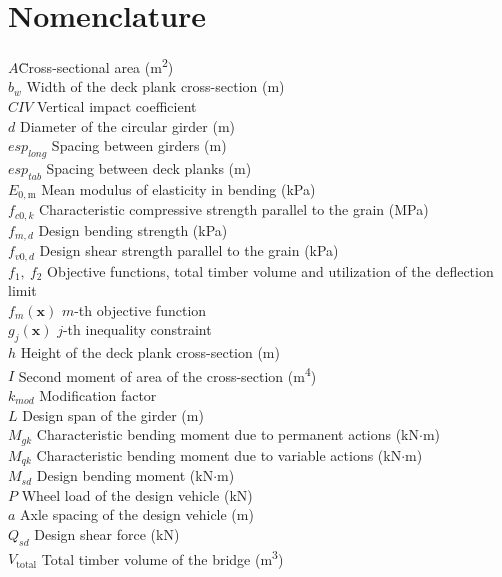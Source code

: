 \section*{Nomenclature}

\begin{tabbing}
$A$\qquad\qquad \= Cross-sectional area (m\textsuperscript{2})\\
$b_w$ \> Width of the deck plank cross-section (m)\\
$CIV$ \> Vertical impact coefficient\\
$d$ \> Diameter of the circular girder (m)\\
$esp_{long}$ \> Spacing between girders (m)\\
$esp_{tab}$ \> Spacing between deck planks (m)\\
$E_{0,\mathrm{m}}$ \> Mean modulus of elasticity in bending (kPa)\\
$f_{c0,k}$ \> Characteristic compressive strength parallel to the grain (MPa)\\
$f_{m,d}$ \> Design bending strength (kPa)\\
$f_{v0,d}$ \> Design shear strength parallel to the grain (kPa)\\
$f_1,\ f_2$ \> Objective functions, total timber volume and utilization of the deflection limit\\
$f_m(\mathbf{x})$ \> $m$-th objective function\\
$g_j(\mathbf{x})$ \> $j$-th inequality constraint\\
$h$ \> Height of the deck plank cross-section (m)\\
$I$ \> Second moment of area of the cross-section (m\textsuperscript{4})\\
$k_{mod}$ \> Modification factor\\
$L$ \> Design span of the girder (m)\\
$M_{gk}$ \> Characteristic bending moment due to permanent actions (kN$\cdot$m)\\
$M_{qk}$ \> Characteristic bending moment due to variable actions (kN$\cdot$m)\\
$M_{sd}$ \> Design bending moment (kN$\cdot$m)\\
$P$ \> Wheel load of the design vehicle (kN)\\
$a$ \> Axle spacing of the design vehicle (m)\\
$Q_{sd}$ \> Design shear force (kN)\\
$V_{\mathrm{total}}$ \> Total timber volume of the bridge (m\textsuperscript{3})\\

\end{tabbing}
